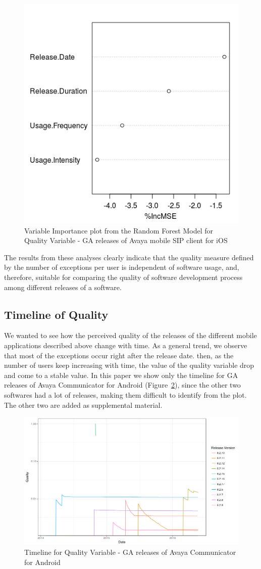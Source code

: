 \documentclass[smallextended]{svjour3}       %
\begin{document}
\begin{figure}[!t]
\centering
\includegraphics[width=0.5\linewidth]{rfqI}
\caption{Variable Importance plot from the Random Forest  Model for Quality Variable - GA releases of Avaya mobile SIP client for iOS}
\label{fig:rf2I}
\end{figure}

The results from these analyses clearly indicate that the quality measure defined by the number of exceptions per user is independent of software usage, and, therefore, suitable for comparing the quality of software development process among different releases of a software.

\subsection{Timeline of Quality}
We wanted to see how the perceived quality of the releases of the different mobile applications described above change with time. As a general trend, we observe that most of the exceptions occur right after the release date. then, as the number of users keep increasing with time, the value of the quality variable drop and come to a stable value.  In this paper we show only the timeline for GA releases of Avaya Communicator for Android (Figure~\ref{fig:tI}), since the other two softwares had a lot of releases, making them difficult to identify from the plot. The other two are added as supplemental material. %

\begin{figure}[!t]
\centering
\includegraphics[width=\linewidth]{timeline_I}
\caption{Timeline for Quality Variable - GA releases of Avaya Communicator for Android}
\label{fig:tI}
\end{figure}
\end{document}

